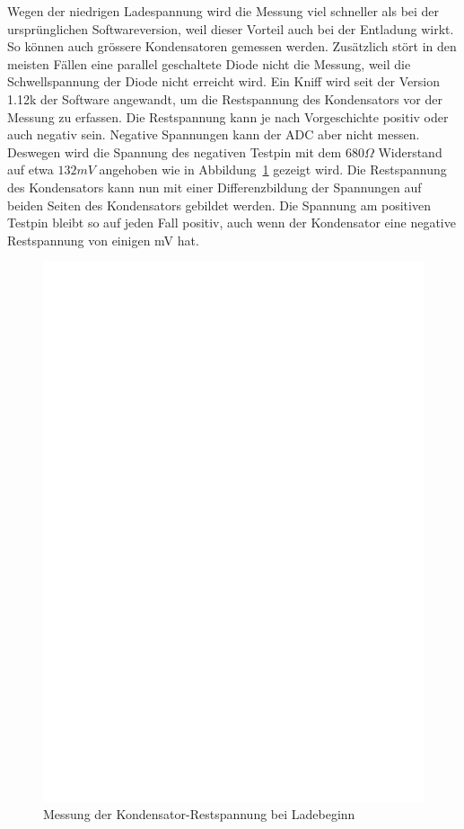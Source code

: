 Wegen der niedrigen Ladespannung wird die Messung viel schneller als bei der ursprünglichen Softwareversion,
weil dieser Vorteil auch bei der Entladung wirkt. So können auch grössere Kondensatoren gemessen werden.
Zusätzlich stört in den meisten Fällen eine parallel geschaltete Diode nicht die Messung, weil die Schwellspannung
der Diode nicht erreicht wird.
Ein Kniff wird seit der Version 1.12k der Software angewandt, um die Restspannung des Kondensators vor der Messung
zu erfassen. Die Restspannung kann je nach Vorgeschichte positiv oder auch negativ sein.
Negative Spannungen kann der ADC aber nicht messen. Deswegen wird die Spannung des negativen Testpin mit dem 
\(680\Omega\) Widerstand auf etwa \(132mV\) angehoben wie in Abbildung~\ref{fig:CapResidV} gezeigt wird.
Die Restspannung des Kondensators kann nun mit einer Differenzbildung der Spannungen auf beiden Seiten des
Kondensators gebildet werden. Die Spannung am positiven Testpin bleibt so auf jeden Fall positiv, auch wenn
der Kondensator eine negative Restspannung von einigen mV hat.

\begin{figure}[H]
\centering
\includegraphics[]{../FIG/Cap_residV.eps}
\caption{Messung der Kondensator-Restspannung bei Ladebeginn}
\label{fig:CapResidV}
\end{figure}

